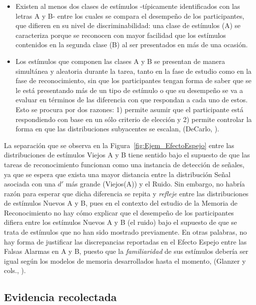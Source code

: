 \begin{itemize}
\item Existen al menos dos clases de estímulos -típicamente identificados con las letras A y B- entre los cuales se compara el desempeño de los participantes, que difieren en su nivel de discriminabilidad: una clase de estímulos (A) se caracteriza porque se reconocen con mayor facilidad que los estímulos contenidos en la segunda clase (B) al ser presentados en más de una ocasión.\\

\item Los estímulos que componen las clases A y B se presentan de manera simultánea y aleatoria durante la tarea, tanto en la fase de estudio como en la fase de reconocimiento, sin que los participantes tengan forma de saber que se le está presentando más de un tipo de estímulo o  que su desempeño se va a evaluar en términos de las diferencia con que respondan a cada uno de estos. Esto se procura por dos razones: 1) permite asumir que el participante está respondiendo con base en un sólo criterio de elección y 2) permite controlar la forma en que las distribuciones subyacentes se escalan, (DeCarlo, \citeyear{DeCarlo2007}).\\
\end{itemize}

La separación que se observa en la Figura~\ref{fig:Ejem_EfectoEspejo} entre las distribuciones de estímulos Viejos A y B tiene sentido bajo el supuesto de que las tareas de reconocimiento funcionan como una instancia de detección de señales, ya que se espera que exista una mayor distancia entre la distribución Señal asociada con una $d'$ más grande (Viejos(A)) y el Ruido. Sin embargo, no habría razón para esperar que dicha diferencia se repita y \textit{refleje} entre las distribuciones de estímulos Nuevos A y B, pues en el contexto del estudio de la Memoria de Reconocimiento no hay cómo explicar que el desempeño de los participantes difiera entre los estímulos Nuevos A y B (el ruido) bajo el supuesto de que se trata de estímulos que no han sido mostrado previamente. En otras palabras, no hay forma de justificar las discrepancias reportadas en el Efecto Espejo entre las Falsas Alarmas en A y B, puesto que la \textit{familiaridad} de sus estímulos debería ser igual según los modelos de memoria desarrollados hasta el momento, (Glanzer y cols., \citeyear{Glanzer1993}).\\

\subsection{Evidencia recolectada}

